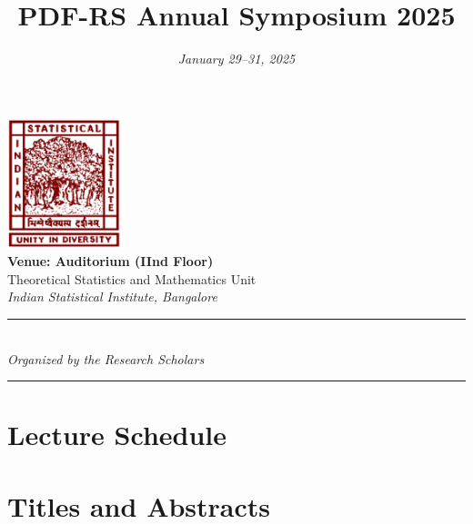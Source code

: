 \documentclass[a4paper,12pt]{article}
\title{\Huge\textbf{PDF-RS Annual Symposium 2025}}
\author{} %
\date{\vspace{-1cm}\Large\textit{January 29--31, 2025}}
\begin{document}
	
	\maketitle
	\thispagestyle{empty} %
	
	\begin{center}
		\vspace{1.5cm}
		\includegraphics[width=0.25\textwidth]{images/isi_logo.png} \\[1.5cm]
		
		{\Huge\textbf{Venue: Auditorium (IInd Floor)}} \\[0.4cm]
		{\Large Theoretical Statistics and Mathematics Unit} \\[0.3cm]
		{\large \textit{Indian Statistical Institute, Bangalore}} \\[2cm]
		
		\rule{\textwidth}{0.5pt} \\[0.6cm]
		{\Large\textit{Organized by the Research Scholars}} \\[0.6cm]
		\rule{\textwidth}{0.5pt}
	\end{center}
	
	\newpage
	
	\section*{Lecture Schedule}
	
	\newpage
	
	\section*{Titles and Abstracts}

    
    
	
\end{document}
